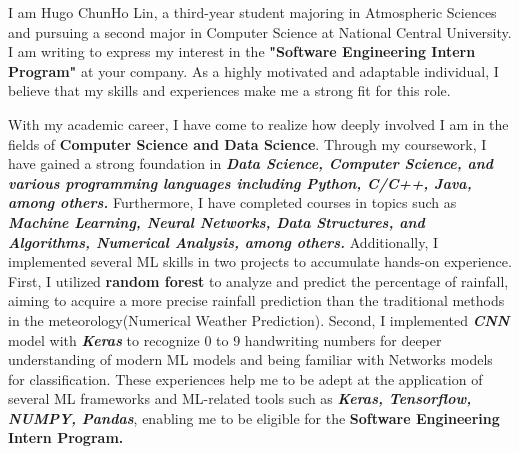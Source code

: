 
I am Hugo ChunHo Lin, a third-year student majoring in Atmospheric Sciences and pursuing a second major in Computer Science at National Central University. I am writing to express my interest in the \textbf{"Software Engineering Intern Program"} at your company. As a highly motivated and adaptable individual, I believe that my skills and experiences make me a strong fit for this role.

With my academic career, I have come to realize how deeply involved I am in the fields of \textbf{Computer Science and Data Science}. Through my coursework, I have gained a strong foundation in \textit{\textbf{Data Science, Computer Science, and various programming languages including Python, C/C++, Java, among others.}} Furthermore, I have completed courses in topics such as \textit{\textbf{Machine Learning, Neural Networks, Data Structures, and Algorithms, Numerical Analysis, among others.}}
Additionally, I implemented several ML skills in two projects to accumulate hands-on experience. 
First, I utilized \textbf{random forest} to analyze and predict the percentage of rainfall, aiming to acquire a more precise rainfall prediction than the traditional methods in the meteorology(Numerical Weather Prediction). 
Second, I implemented \textit{\textbf{CNN}} model with \textit{\textbf{Keras}} to recognize 0 to 9 handwriting numbers for deeper understanding of modern ML models and being familiar with Networks models for classification. 
These experiences help me to be adept at the application of several ML frameworks and ML-related tools such as \textbf{\textit{Keras, Tensorflow, NUMPY, Pandas}}, enabling me to be eligible for the \textbf{Software Engineering Intern Program.} 

